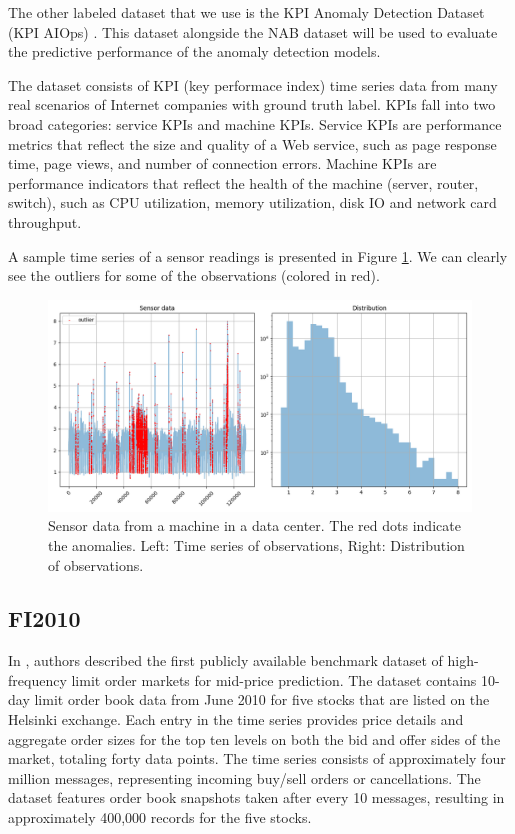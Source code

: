 \documentclass[a4paper, twoside]{report}
\theoremstyle{definition}
\numberwithin{equation}{section}
\begin{document}
The other labeled dataset that we use is the KPI Anomaly Detection Dataset (KPI AIOps) \cite{2208.03938}.
This dataset alongside the NAB dataset will be used to evaluate the predictive performance of the anomaly detection models.

The dataset consists of KPI (key performace index) time series data from many
real scenarios of Internet companies with ground truth label. KPIs fall into two
broad categories: service KPIs and machine KPIs. Service KPIs are performance metrics
that reflect the size and quality of a Web service, such as page response time, page views,
and number of connection errors. Machine KPIs are performance indicators that reflect
the health of the machine (server, router, switch), such as CPU utilization, memory utilization,
disk IO and network card throughput.

A sample time series of a sensor readings is presented in Figure \ref{fig:KPIAIOps_example}.
We can clearly see the outliers for some of the observations (colored in red).
\begin{figure}[h!]
    \centering
    \includegraphics[width=\textwidth]{KPIAIOps_example.png}
    \caption{Sensor data from a machine in a data center. The red dots indicate the anomalies. Left: Time series of observations, Right: Distribution of observations.}
    \label{fig:KPIAIOps_example}
\end{figure}

\subsection{FI2010}

In \cite{1705.03233}, authors described the first publicly available benchmark dataset of high-frequency limit order markets for mid-price prediction.
The dataset contains 10-day limit order book data from June 2010 for five stocks that are listed on the Helsinki exchange.
Each entry in the time series provides price details and aggregate order sizes for the top ten levels on both the bid and offer sides of the market,
totaling forty data points. The time series consists of approximately four million messages, representing incoming buy/sell orders or cancellations.
The dataset features order book snapshots taken after every 10 messages, resulting in approximately 400,000 records for the five stocks.
\end{document}
